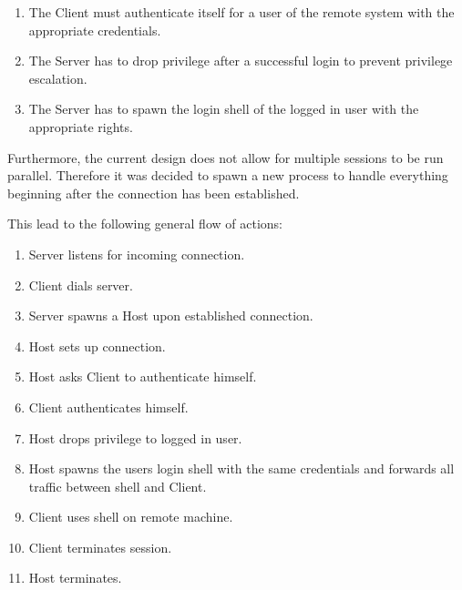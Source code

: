 \documentclass[10pt,a4paper,titlepage,twoside,english,final]{zhawreprt}
\begin{document}
\begin{enumerate}
\item The Client must authenticate itself for a user of the remote system with the appropriate credentials.
\item The Server has to drop privilege after a successful login to prevent privilege escalation.
\item The Server has to spawn the login \gls{shell} of the logged in user with the appropriate rights.
\end{enumerate}

Furthermore, the current design does not allow for multiple sessions to be run parallel. Therefore it was decided to spawn a new process to handle everything beginning after the connection has been established.

This lead to  the following general flow of actions:

\begin{enumerate}
\item Server listens for incoming connection.
\item Client dials server.
\item Server spawns a Host upon established connection.
\item Host sets up connection.
\item Host asks Client to authenticate himself.
\item Client authenticates himself.
\item Host drops privilege to logged in user.
\item Host spawns the users login \gls{shell} with the same credentials and forwards all traffic between \gls{shell} and Client.
\item Client uses \gls{shell} on remote machine.
\item Client terminates session.
\item Host terminates.
\end{enumerate}

\newpage
\end{document}
